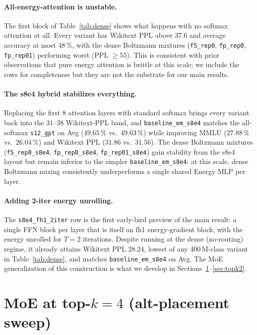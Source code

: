\documentclass[oneside]{article}
\begin{document}
\paragraph{All-energy-attention is unstable.}
The first block of Table~\ref{tab:dense} shows what happens with no
softmax attention at all. Every variant has Wikitext PPL above $37.6$
and average accuracy at most $48\,\%$, with the dense Boltzmann
mixtures (\texttt{f5\_rep0}, \texttt{fp\_rep0}, \texttt{fp\_rep01})
performing worst (PPL $\geq 55$). This is consistent with prior
observations that pure energy attention is brittle at this scale; we
include the rows for completeness but they are not the substrate for
our main results.

\paragraph{The s8e4 hybrid stabilizes everything.}
Replacing the first 8 attention layers with standard softmax brings
every variant back into the $31$--$38$ Wikitext-PPL band, and
\texttt{baseline\_em\_s8e4} matches the all-softmax \texttt{s12\_gpt}
on Avg ($49.65\,\%$ vs.\ $49.63\,\%$) while improving MMLU
($27.88\,\%$ vs.\ $26.04\,\%$) and Wikitext PPL ($31.86$ vs.\ $31.56$).
The dense Boltzmann mixtures (\texttt{f5\_rep0\_s8e4},
\texttt{fp\_rep0\_s8e4}, \texttt{fp\_rep01\_s8e4}) gain stability from
the s8e4 layout but remain inferior to the simpler
\texttt{baseline\_em\_s8e4}: at this scale, dense Boltzmann mixing
consistently underperforms a single shared Energy MLP per layer.

\paragraph{Adding 2-iter energy unrolling.}
The \texttt{s8e4\_fh1\_2iter} row is the first early-bird preview of
the main result: a single FFN block per layer that is itself an fh1
energy-gradient block, with the energy unrolled for $T{=}2$ iterations.
Despite running at the dense (no-routing) regime, it already attains
Wikitext PPL $28.24$, lowest of any 400\,M-class variant in
Table~\ref{tab:dense}, and matches \texttt{baseline\_em\_s8e4} on Avg.
The MoE generalization of this construction is what we develop in
Sections~\ref{sec:topk4}--\ref{sec:topk2}.


\section{MoE at top-$k=4$ (alt-placement sweep)}
\label{sec:topk4}
\end{document}
